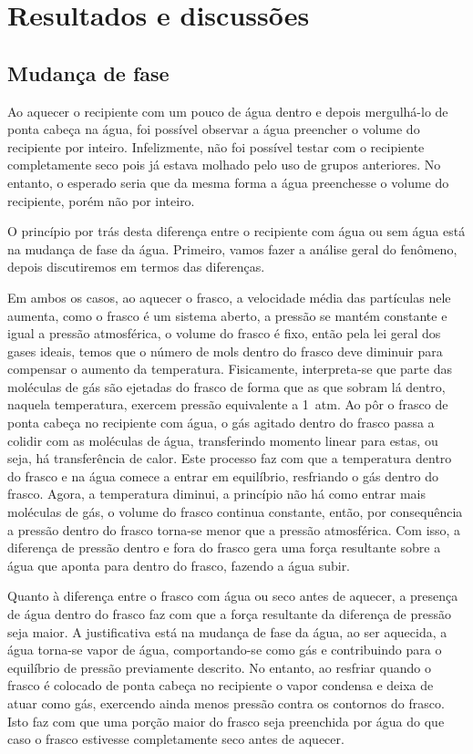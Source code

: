 \section{Resultados e discussões}

\subsection{Mudança de fase} %
Ao aquecer o recipiente com um pouco de água dentro e depois mergulhá-lo de ponta cabeça na água, foi possível observar a água preencher o volume do recipiente por inteiro. Infelizmente, não foi possível testar com o recipiente completamente seco pois já estava molhado pelo uso de grupos anteriores. No entanto, o esperado seria que da mesma forma a água preenchesse o volume do recipiente, porém não por inteiro. 

O princípio por trás desta diferença entre o recipiente com água ou sem água está na mudança de fase da água. Primeiro, vamos fazer a análise geral do fenômeno, depois discutiremos em termos das diferenças. 

Em ambos os casos, ao aquecer o frasco, a velocidade média das partículas nele aumenta, como o frasco é um sistema aberto, a pressão se mantém constante e igual a pressão atmosférica, o volume do frasco é fixo, então pela lei geral dos gases ideais, temos que o número de mols dentro do frasco deve diminuir para compensar o aumento da temperatura. Fisicamente, interpreta-se que parte das moléculas de gás são ejetadas do frasco de forma que as que sobram lá dentro, naquela temperatura, exercem pressão equivalente a \qty{1}{atm}. Ao pôr o frasco de ponta cabeça no recipiente com água, o gás agitado dentro do frasco passa a colidir com as moléculas de água, transferindo momento linear para estas, ou seja, há transferência de calor. Este processo faz com que a temperatura dentro do frasco e na água comece a entrar em equilíbrio, resfriando o gás dentro do frasco. Agora, a temperatura diminui, a princípio não há como entrar mais moléculas de gás, o volume do frasco continua constante, então, por consequência a pressão dentro do frasco torna-se menor que a pressão atmosférica. Com isso, a diferença de pressão dentro e fora do frasco gera uma força resultante sobre a água que aponta para dentro do frasco, fazendo a água subir.

Quanto à diferença entre o frasco com água ou seco antes de aquecer, a presença de água dentro do frasco faz com que a força resultante da diferença de pressão seja maior. A justificativa está na mudança de fase da água, ao ser aquecida, a água torna-se vapor de água, comportando-se como gás e contribuindo para o equilíbrio de pressão previamente descrito. No entanto, ao resfriar quando o frasco é colocado de ponta cabeça no recipiente o vapor condensa e deixa de atuar como gás, exercendo ainda menos pressão contra os contornos do frasco. Isto faz com que uma porção maior do frasco seja preenchida por água do que caso o frasco estivesse completamente seco antes de aquecer.

